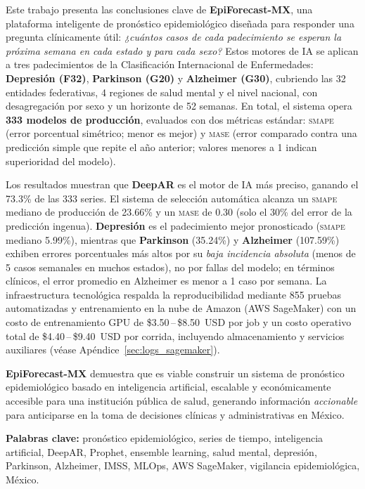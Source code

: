 \documentclass[12pt, letterpaper]{article}
\newcommand{\smape}{\textnormal{\textsc{smape}}}
\newcommand{\mase}{\textnormal{\textsc{mase}}}
\begin{document}
Este trabajo presenta las conclusiones clave de \textbf{EpiForecast-MX}, una plataforma inteligente de pronóstico epidemiológico diseñada para responder una pregunta clínicamente útil: \textit{¿cuántos casos de cada padecimiento se esperan la próxima semana en cada estado y para cada sexo?}
Estos motores de IA se aplican a tres padecimientos de la Clasificación Internacional de Enfermedades: \textbf{Depresión (F32)}, \textbf{Parkinson (G20)} y \textbf{Alzheimer (G30)}, cubriendo las 32 entidades federativas, 4 regiones de salud mental y el nivel nacional, con desagregación por sexo y un horizonte de 52 semanas. En total, el sistema opera \textbf{333 modelos de producción}, evaluados con dos métricas estándar: \smape{} (error porcentual simétrico; menor es mejor) y \mase{} (error comparado contra una predicción simple que repite el año anterior; valores menores a 1 indican superioridad del modelo).

Los resultados muestran que \textbf{DeepAR} es el motor de IA más preciso, ganando el 73.3\% de las 333 series. El sistema de selección automática alcanza un \smape{} mediano de producción de 23.66\% y un \mase{} de 0.30 (solo el 30\% del error de la predicción ingenua). \textbf{Depresión} es el padecimiento mejor pronosticado (\smape{} mediano 5.99\%), mientras que \textbf{Parkinson} (35.24\%) y \textbf{Alzheimer} (107.59\%) exhiben errores porcentuales más altos por su \emph{baja incidencia absoluta} (menos de 5 casos semanales en muchos estados), no por fallas del modelo; en términos clínicos, el error promedio en Alzheimer es menor a 1 caso por semana. La infraestructura tecnológica respalda la reproducibilidad mediante 855 pruebas automatizadas y entrenamiento en la nube de Amazon (AWS SageMaker) con un costo de entrenamiento GPU de \$3.50\,--\,\$8.50~USD por job y un costo operativo total de \$4.40\,--\,\$9.40~USD por corrida, incluyendo almacenamiento y servicios auxiliares (véase Apéndice~\ref{sec:logs_sagemaker}).

\textbf{EpiForecast-MX} demuestra que es viable construir un sistema de pronóstico epidemiológico basado en inteligencia artificial, escalable y económicamente accesible para una institución pública de salud, generando información \emph{accionable} para anticiparse en la toma de decisiones clínicas y administrativas en México.

\vspace{0.8cm}

\noindent\textbf{Palabras clave:} pronóstico epidemiológico, series de tiempo, inteligencia artificial, DeepAR, Prophet, ensemble learning, salud mental, depresión, Parkinson, Alzheimer, IMSS, MLOps, AWS SageMaker, vigilancia epidemiológica, México.
\end{document}

